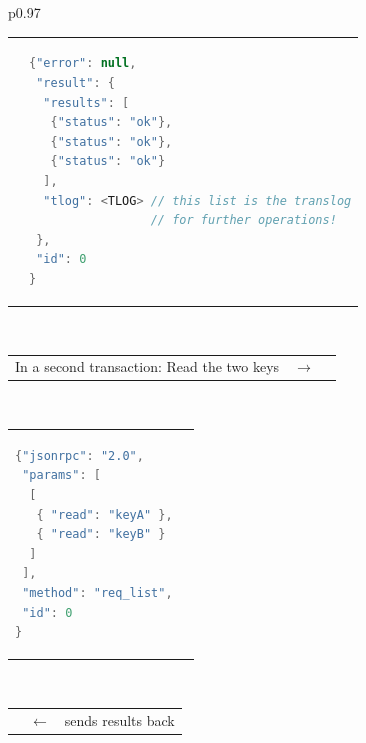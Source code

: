 \documentclass[a4paper]{scrreprt}
\begin{document}
\begin{longtable}{p{}}
\begin{tabular}{p{}p{}}
& 
\vspace{-1.5em}%
\begin{lstlisting}[language=java]
{"error": null,
 "result": {
  "results": [
   {"status": "ok"},
   {"status": "ok"},
   {"status": "ok"}
  ],
  "tlog": <TLOG> // this list is the translog
                 // for further operations!
 },
 "id": 0
}
\end{lstlisting} \\
\end{tabular}\vspace{-1em} \\
%
\begin{tabular}{p{}cp{}}
In a second transaction: Read the two keys & $\to$ & \\
\end{tabular}\vspace{-1.5em} \\
%
\begin{tabular}{p{}p{}}
\vspace{-1.5em}%
\begin{lstlisting}[language=java]
{"jsonrpc": "2.0",
 "params": [
  [
   { "read": "keyA" },
   { "read": "keyB" }
  ]
 ],
 "method": "req_list",
 "id": 0
}
\end{lstlisting}
& \\
\end{tabular}\vspace{-1em} \\
%
\begin{tabular}{p{}cp{}}
 & $\leftarrow$ & \hfill{}\scalaris{} sends results back \\
\end{tabular}\vspace{-1.5em} \\


\end{longtable}
\end{document}
